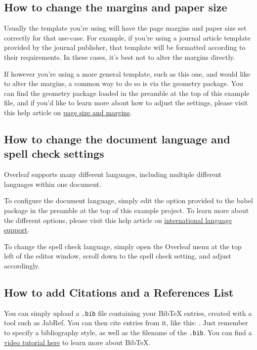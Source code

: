 \documentclass{article}
\begin{document}
\subsection{How to change the margins and paper size}

Usually the template you're using will have the page margins and paper size set correctly for that use-case. For example, if you're using a journal article template provided by the journal publisher, that template will be formatted according to their requirements. In these cases, it's best not to alter the margins directly.

If however you're using a more general template, such as this one, and would like to alter the margins, a common way to do so is via the geometry package. You can find the geometry package loaded in the preamble at the top of this example file, and if you'd like to learn more about how to adjust the settings, please visit this help article on \href{https://www.overleaf.com/learn/latex/page_size_and_margins}{page size and margins}.

\subsection{How to change the document language and spell check settings}

Overleaf supports many different languages, including multiple different languages within one document. 

To configure the document language, simply edit the option provided to the babel package in the preamble at the top of this example project. To learn more about the different options, please visit this help article on \href{https://www.overleaf.com/learn/latex/International_language_support}{international language support}.

To change the spell check language, simply open the Overleaf menu at the top left of the editor window, scroll down to the spell check setting, and adjust accordingly.

\subsection{How to add Citations and a References List}

You can simply upload a \verb|.bib| file containing your BibTeX entries, created with a tool such as JabRef. You can then cite entries from it, like this: \cite{greenwade93}. Just remember to specify a bibliography style, as well as the filename of the \verb|.bib|. You can find a \href{https://www.overleaf.com/help/97-how-to-include-a-bibliography-using-bibtex}{video tutorial here} to learn more about BibTeX.
\end{document}
